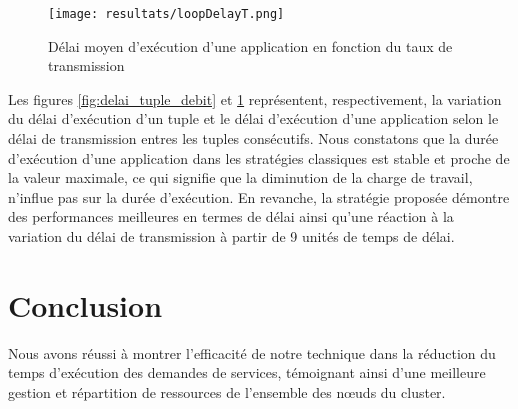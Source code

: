\begin{figure}[H]
  \centering
  \texttt{[image: resultats/loopDelayT.png]}
  \caption{Délai moyen d'exécution d'une application en fonction du taux de transmission}
  \label{fig:delai_application_debit}
\end{figure}

Les figures \ref{fig:delai_tuple_debit} et \ref{fig:delai_application_debit} représentent, respectivement, la variation du délai d'exécution d'un tuple et le délai d'exécution d'une application selon le délai de transmission entres les tuples consécutifs.
Nous constatons que la durée d'exécution d'une application dans les stratégies classiques est stable et proche de la valeur maximale, ce qui signifie que la diminution de la charge de travail, n'influe pas sur la durée d'exécution. En revanche, la stratégie proposée démontre des performances meilleures en termes de délai ainsi qu'une réaction à la variation du délai de transmission à partir de 9 unités de temps de délai.\par

\section{Conclusion}
Nous avons réussi à montrer l'efficacité de notre technique dans la réduction du temps d'exécution des demandes de services, témoignant ainsi d'une meilleure gestion et répartition de ressources de l'ensemble des nœuds du cluster.